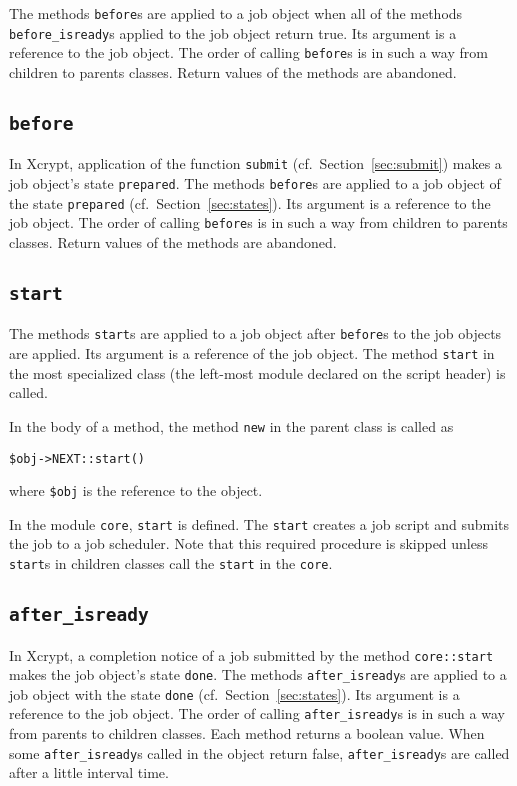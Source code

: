 \documentclass[a4paper,10pt]{report}
\def\|{\verb|} %|
\begin{document}
The methods \texttt{before}s are applied to a job object when all of
the methods \texttt{before\_isready}s applied to the job object return
true.  Its argument is a reference to the job object.  The order of calling
\texttt{before}s is in such a way from children to parents
classes.  Return values of the methods are abandoned.
\fi

\subsection{\texttt{before}}

In Xcrypt, application of the function \|submit| (cf.\
Section~\ref{sec:submit}) makes a job object's state \|prepared|.  The
methods \texttt{before}s are applied to a job object of the state
\|prepared| (cf.\ Section~\ref{sec:states}).  Its argument is a
reference to the job object.  The order of calling \texttt{before}s is
in such a way from children to parents classes.  Return values of the
methods are abandoned.

\subsection{\texttt{start}}

The methods \texttt{start}s are applied to a job object after
\texttt{before}s to the job objects are applied.  Its argument is a
reference of the job object.  The method \|start| in the most
specialized class (the left-most module declared on the script header)
is called.

In the body of a method, the method \|new| in the parent class is
called as
\begin{center}
 \|$obj->NEXT::start()|
\end{center}
where \|$obj| is the reference to the object.

In the module \|core|, \|start| is defined.  The \|start| creates a
job script and submits the job to a job scheduler.  Note that this
required procedure is skipped unless \|start|s in children classes call
the \|start| in the \|core|.

\subsection{\texttt{after\_isready}}

In Xcrypt, a completion notice of a job submitted by the method
 \|core::start| makes the job object's state \|done|.  The methods
 \texttt{after\_isready}s are applied to a job object with the state
 \|done| (cf.\ Section~\ref{sec:states}).  Its argument is a reference
 to the job object.  The order of calling \texttt{after\_isready}s is
 in such a way from parents to children classes.  Each method
 returns a boolean value.  When some \texttt{after\_isready}s called
 in the object return false, \texttt{after\_isready}s are called
 after a little interval time.
\end{document}
